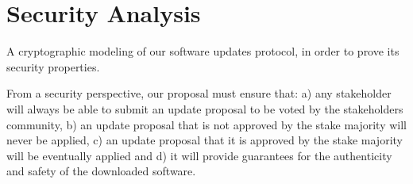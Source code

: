 \section{Security Analysis}
A cryptographic modeling of our software updates protocol, in order to prove its security properties. 

From a security perspective, our proposal must ensure that:
a) any stakeholder will always be able to submit an update proposal to be voted by the stakeholders community, b) an update proposal that is not approved by the stake majority will never be applied, c) an update proposal that it is approved by the stake majority will be eventually applied
and d) it will provide guarantees for the authenticity and safety of the downloaded software.
